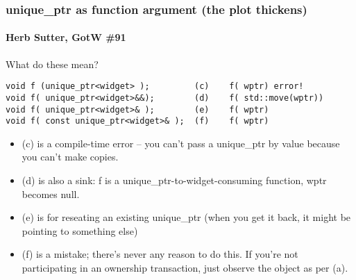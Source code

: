\begin{frame}[fragile]
\frametitle{unique\_ptr as function argument (the plot thickens)}
\framesubtitle{Herb Sutter, GotW \#91}

What do these mean?

{\scriptsize\begin{verbatim}
void f (unique_ptr<widget> );         (c)    f( wptr) error!
void f( unique_ptr<widget>&&);        (d)    f( std::move(wptr))
void f( unique_ptr<widget>& );        (e)    f( wptr)
void f( const unique_ptr<widget>& );  (f)    f( wptr)
\end{verbatim}}

\begin{itemize}
\item (c) is a compile-time error -- you can't pass a unique\_ptr by
  value because you can't make copies.
\item (d) is also a sink:  f is a unique\_ptr-to-widget-consuming
  function, wptr becomes null.
\pause{}
\item (e) is for reseating an existing unique\_ptr (when you get it
  back, it might be pointing to something else)
\pause{}
\item (f) is a mistake; there's never any reason to do this.  If
  you're not participating in an ownership transaction, just observe
  the object as per (a).
\end{itemize}

\end{frame}


